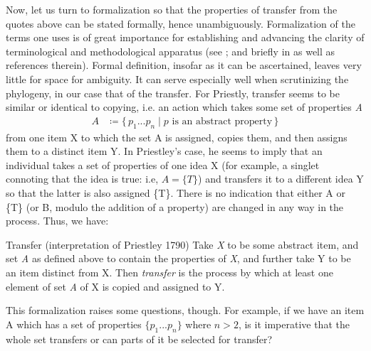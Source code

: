 \documentclass{article}
\newcommand\Set[2]{\{\,#1\mid#2\,\}}
\begin{document}
Now, let us turn to formalization so that the properties of transfer from the quotes above can be stated formally, hence unambiguously. Formalization of the terms one uses is of great importance for establishing and advancing the clarity of terminological and methodological apparatus (see \cite{collins_chomsky_2021}; and briefly in \cite{zaccarella_neuroscience_2021} as well as references therein). Formal definition, insofar as it can be ascertained, leaves very little for space for ambiguity. It can serve especially well when scrutinizing the phylogeny, in our case that of the transfer. For Priestly, transfer seems to be similar or identical to copying, i.e. an action which takes some set of properties \textit{A} 
\begin{align*}
A  &\coloneqq \Set{p_1...p_n}{\textit{p} \textrm{ is an abstract property}}
\end{align*}
from one item X to which the set A is assigned, copies them, and then assigns them to a distinct item Y. In Priestley’s case, he seems to imply that an individual takes a set of properties of one idea X (for example, a singlet connoting that the idea is true: i.e, \(A = \{T\}\)) and transfers it to a different idea Y so that the latter is also assigned \{T\}. There is no indication that either A or \{T\} (or B, modulo the addition of a property) are changed in any way in the process. Thus, we have:

\pex Transfer (interpretation of Priestley 1790)
\a Take \textit{X} to be some abstract item, and set \textit{A} as defined above to contain the properties of \textit{X}, and further take Y to be an item distinct from X. 
\a Then \textit{transfer} is the process by which at least one element of set \textit{A} of X is copied and assigned to Y.
\xe

This formalization raises some questions, though. For example, if we have an item A which has a set of properties $\{p_1...p_n\}$ where $n>2$, is it imperative that the whole set transfers or can parts of it be selected for transfer? 
\end{document}
